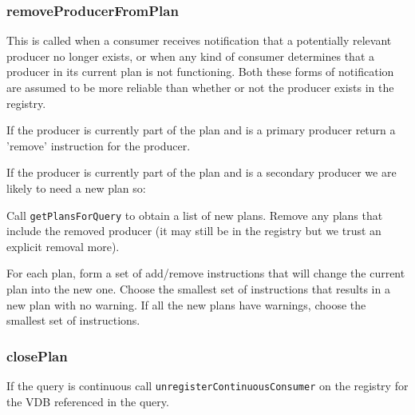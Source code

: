 \subsubsection{removeProducerFromPlan}

This is called when a consumer receives notification that a potentially relevant
producer no longer exists, or when any kind of consumer determines that a
producer in its current plan is not functioning. Both these forms of notification
are assumed to be more reliable than whether or not the producer exists in the
registry.

If the producer is currently part of the plan and is a primary producer return a
'remove' instruction for the producer.

If the producer is currently part of the plan and is a secondary producer we are
likely to need a new plan so:

Call \texttt{getPlansForQuery} to obtain a list of new plans. Remove any plans
that include the removed producer (it may still be in the registry but we trust
an explicit removal more).

For each plan, form a set of add/remove instructions that will change the current
plan into the new one. Choose the smallest set of instructions that results in a
new plan with no warning. If all the new plans have warnings, choose the smallest
set of instructions.
 
\subsubsection{closePlan}

 If the query is continuous call \texttt{unregisterContinuousConsumer} on
  the registry for the VDB referenced in the query.



